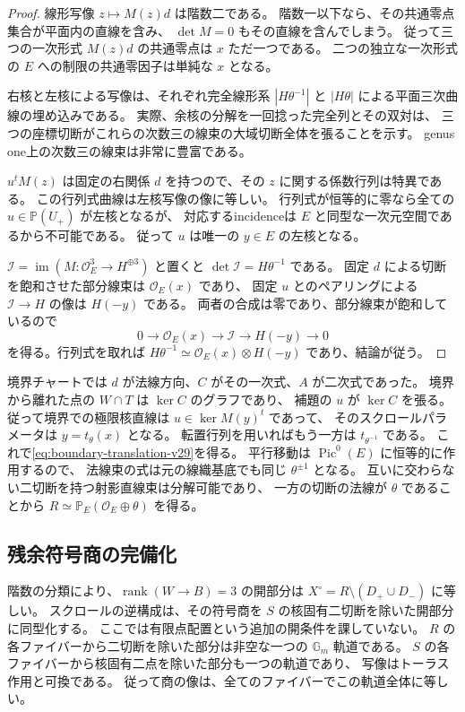 \begin{proof}
線形写像 $z\mapsto M(z)d$ は階数二である。
階数一以下なら、その共通零点集合が平面内の直線を含み、
$\det M=0$ もその直線を含んでしまう。
従って三つの一次形式 $M(z)d$ の共通零点は $x$ ただ一つである。
二つの独立な一次形式の $E$ への制限の共通零因子は単純な $x$ となる。

右核と左核による写像は、それぞれ完全線形系
$|H\theta^{-1}|$ と $|H\theta|$ による平面三次曲線の埋め込みである。
実際、余核の分解を一回捻った完全列とその双対は、
三つの座標切断がこれらの次数三の線束の大域切断全体を張ることを示す。
genus one上の次数三の線束は非常に豊富である。

$u^tM(z)$ は固定の右関係 $d$ を持つので、その $z$ に関する係数行列は特異である。
この行列式曲線は左核写像の像に等しい。
行列式が恒等的に零なら全ての $u\in\mathbb P(U_+)$ が左核となるが、
対応するincidenceは $E$ と同型な一次元空間であるから不可能である。
従って $u$ は唯一の $y\in E$ の左核となる。

$\mathcal I=\operatorname{im}(M:\mathcal O_E^3\to H^{\oplus3})$ と置くと
$\det\mathcal I=H\theta^{-1}$ である。
固定 $d$ による切断を飽和させた部分線束は $\mathcal O_E(x)$ であり、
固定 $u$ とのペアリングによる $\mathcal I\to H$ の像は $H(-y)$ である。
両者の合成は零であり、部分線束が飽和しているので
\[
 0\longrightarrow\mathcal O_E(x)\longrightarrow\mathcal I
 \longrightarrow H(-y)\longrightarrow0
\]
を得る。行列式を取れば
$H\theta^{-1}\simeq\mathcal O_E(x)\otimes H(-y)$ であり、結論が従う。
\end{proof}

境界チャートでは $d$ が法線方向、$C$ がその一次式、$A$ が二次式であった。
境界から離れた点の $W\cap T$ は $\ker C$ のグラフであり、
補題の $u$ が $\ker C$ を張る。
従って境界での極限核直線は $u\in\ker M(y)^t$ であって、
そのスクロールパラメータは $y=t_\theta(x)$ となる。
転置行列を用いればもう一方は $t_{\theta^{-1}}$ である。
これで\eqref{eq:boundary-translation-v29}を得る。
平行移動は $\operatorname{Pic}^0(E)$ に恒等的に作用するので、
法線束の式は元の線織基底でも同じ $\theta^{\pm1}$ となる。
互いに交わらない二切断を持つ射影直線束は分解可能であり、
一方の切断の法線が $\theta$ であることから $R\simeq\mathbb P_E(\mathcal O_E\oplus\theta)$ を得る。

\subsection{残余符号商の完備化}

階数の分類により、$\operatorname{rank}(W\to B)=3$ の開部分は
$X^\circ=R\setminus(D_+\cup D_-)$ に等しい。
スクロールの逆構成は、その符号商を $S$ の核固有二切断を除いた開部分に同型化する。
ここでは有限点配置という追加の開条件を課していない。
$R$ の各ファイバーから二切断を除いた部分は非空な一つの $\mathbb G_m$ 軌道である。
$S$ の各ファイバーから核固有二点を除いた部分も一つの軌道であり、
写像はトーラス作用と可換である。
従って商の像は、全てのファイバーでこの軌道全体に等しい。

